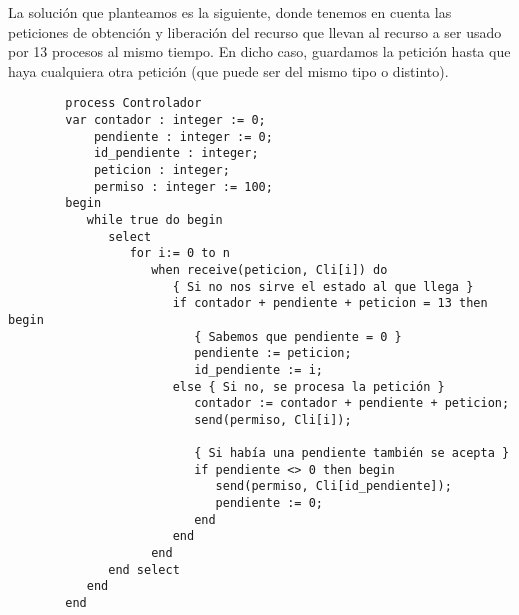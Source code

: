 \begin{ejercicio}
    La solución que planteamos es la siguiente, donde tenemos en cuenta las peticiones de obtención y liberación del recurso que llevan al recurso a ser usado por 13 procesos al mismo tiempo. En dicho caso, guardamos la petición hasta que haya cualquiera otra petición (que puede ser del mismo tipo o distinto).
    \begin{verbatim}
        process Controlador
        var contador : integer := 0;
            pendiente : integer := 0;
            id_pendiente : integer;
            peticion : integer;
            permiso : integer := 100;
        begin
           while true do begin
              select 
                 for i:= 0 to n
                    when receive(peticion, Cli[i]) do
                       { Si no nos sirve el estado al que llega }
                       if contador + pendiente + peticion = 13 then begin
                          { Sabemos que pendiente = 0 }
                          pendiente := peticion;
                          id_pendiente := i;
                       else { Si no, se procesa la petición }
                          contador := contador + pendiente + peticion;
                          send(permiso, Cli[i]);

                          { Si había una pendiente también se acepta }
                          if pendiente <> 0 then begin
                             send(permiso, Cli[id_pendiente]);
                             pendiente := 0;
                          end
                       end
                    end
              end select
           end
        end
    \end{verbatim}
    
\end{ejercicio}

